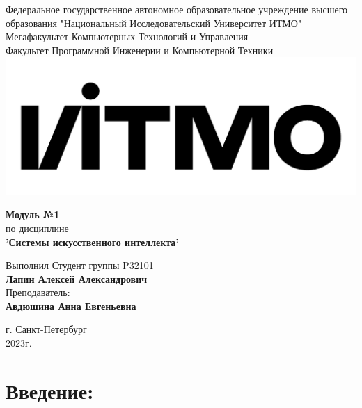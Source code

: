 \documentclass[12pt,onecolumn]{article}
\begin{document}
\setcounter{tocdepth}{4}
\begin{center}
    Федеральное государственное автономное образовательное учреждение высшего образования "Национальный Исследовательский Университет ИТМО"\\ 
    Мегафакультет Компьютерных Технологий и Управления\\
    Факультет Программной Инженерии и Компьютерной Техники \\
    \includegraphics[scale=0.3]{image/itmo.jpg} %
\end{center}
\vspace{1cm}


\begin{center}
    \textbf{Модуль №1}\\
    по дисциплине\\
    \textbf{'Системы искусственного интеллекта'}
\end{center}

\vspace{2cm}

\begin{flushright}
  Выполнил Студент  группы P32101\\
  \textbf{Лапин Алексей Александрович}\\
  Преподаватель: \\
  \textbf{Авдюшина Анна Евгеньевна}\\
\end{flushright}

\vspace{6cm}
\begin{center}
    г. Санкт-Петербург\\
    2023г.
\end{center}

\newpage
\tableofcontents
\newpage

\section{Введение:}
\end{document}
